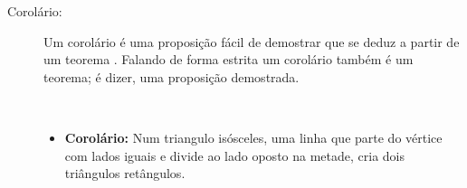 \begin{description}
\item[Corolário:]  Um corolário é uma proposição 
fácil de demostrar que se deduz a partir de um teorema \cite[pp. 49]{fossa2009introducao} \cite[pp. 41]{solow1987como}.
Falando de forma estrita um corolário também é um teorema; é dizer, uma proposição demostrada.
\begin{example}~\\
\begin{itemize}
\item \textbf{Corolário:} Num triangulo isósceles, 
uma linha que parte do vértice com lados iguais e divide ao lado oposto na metade,
cria dois triângulos retângulos.
\end{itemize}
\end{example}

\end{description}

